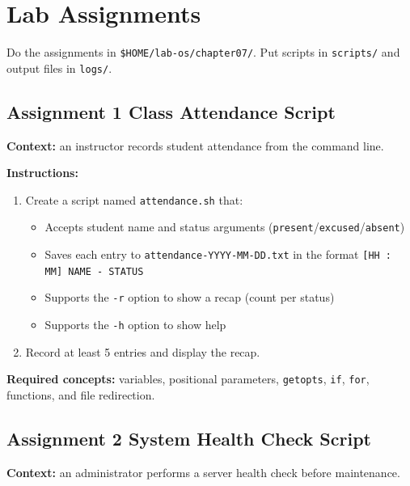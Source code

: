 \section{Lab Assignments}
\label{sec:lab-assignment-bash-prog}

\begin{warningbox}
Do the assignments in \texttt{\$HOME/lab-os/chapter07/}. Put scripts in
\texttt{scripts/} and output files in \texttt{logs/}.
\end{warningbox}

\subsection*{Assignment 1 Class Attendance Script}

\textbf{Context:} an instructor records student attendance from the command
line.

\textbf{Instructions:}
\begin{enumerate}
  \item Create a script named \texttt{attendance.sh} that:
  \begin{itemize}
    \item Accepts student name and status arguments
      (\texttt{present}/\texttt{excused}/\texttt{absent})
    \item Saves each entry to \texttt{attendance-YYYY-MM-DD.txt} in the format
      \texttt{[HH : MM] NAME - STATUS}
    \item Supports the \texttt{-r} option to show a recap (count per status)
    \item Supports the \texttt{-h} option to show help
  \end{itemize}
  \item Record at least 5 entries and display the recap.
\end{enumerate}

\textbf{Required concepts:} variables, positional parameters,
\texttt{getopts}, \texttt{if}, \texttt{for}, functions, and file
redirection.

\subsection*{Assignment 2 System Health Check Script}

\textbf{Context:} an administrator performs a server health check before
maintenance.

